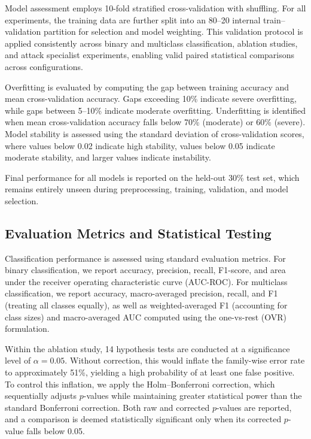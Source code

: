 \documentclass[pdflatex,sn-mathphys-num]{sn-jnl}
\theoremstyle{thmstyleone}%
\theoremstyle{thmstyletwo}%
\theoremstyle{thmstylethree}%
\begin{document}
Model assessment employs 10-fold stratified cross-validation with shuffling. For all experiments, the training data are further split into an 80--20 internal train--validation partition for selection and model weighting. This validation protocol is applied consistently across binary and multiclass classification, ablation studies, and attack specialist experiments, enabling valid paired statistical comparisons across configurations.

Overfitting is evaluated by computing the gap between training accuracy and mean cross-validation accuracy. Gaps exceeding 10\% indicate severe overfitting, while gaps between 5--10\% indicate moderate overfitting. Underfitting is identified when mean cross-validation accuracy falls below 70\% (moderate) or 60\% (severe). Model stability is assessed using the standard deviation of cross-validation scores, where values below 0.02 indicate high stability, values below 0.05 indicate moderate stability, and larger values indicate instability.

Final performance for all models is reported on the held-out 30\% test set, which remains entirely unseen during preprocessing, training, validation, and model selection.

\subsection{Evaluation Metrics and Statistical Testing}

Classification performance is assessed using standard evaluation metrics. For binary classification, we report accuracy, precision, recall, F1-score, and area under the receiver operating characteristic curve (AUC-ROC). For multiclass classification, we report accuracy, macro-averaged precision, recall, and F1 (treating all classes equally), as well as weighted-averaged F1 (accounting for class sizes) and macro-averaged AUC computed using the one-vs-rest (OVR) formulation. 

Within the ablation study, 14 hypothesis tests are conducted at a significance level of $\alpha=0.05$. Without correction, this would inflate the family-wise error rate to approximately 51\%, yielding a high probability of at least one false positive. To control this inflation, we apply the Holm–Bonferroni correction, which sequentially adjusts $p$-values while maintaining greater statistical power than the standard Bonferroni correction. Both raw and corrected $p$-values are reported, and a comparison is deemed statistically significant only when its corrected $p$-value falls below 0.05. 
\end{document}
